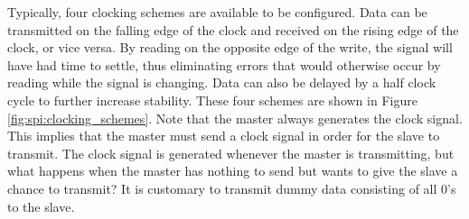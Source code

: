 Typically, four clocking schemes are available to be configured. Data can be transmitted on the falling edge of the clock and received on the rising edge of the clock, or vice versa. By reading on the opposite edge of the write, the signal will have had time to settle, thus eliminating errors that would otherwise occur by reading while the signal is changing. Data can also be delayed by a half clock cycle to further increase stability. These four schemes are shown in Figure \ref{fig:spi:clocking_schemes}. Note that the master always generates the clock signal. This implies that the master must send a clock signal in order for the slave to transmit. The clock signal is generated whenever the master is transmitting, but what happens when the master has nothing to send but wants to give the slave a chance to transmit? It is customary to transmit dummy data consisting of all 0's to the slave.

